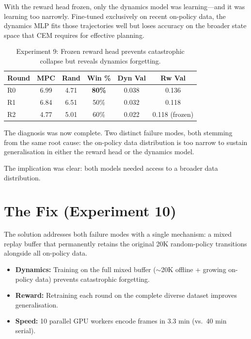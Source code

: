 \documentclass{article}
\begin{document}
\begin{failurebox}
\small With the reward head frozen, only the dynamics model was learning---and it was learning too narrowly. Fine-tuned exclusively on recent on-policy data, the dynamics MLP fits those trajectories well but loses accuracy on the broader state space that CEM requires for effective planning.
\end{failurebox}

\begin{table}[H]
\centering
\caption{Experiment 9: Frozen reward head prevents catastrophic collapse but reveals dynamics forgetting.}
\label{tab:exp9}
\begin{tabular}{lccccc}
\toprule
\textbf{Round} & \textbf{MPC} & \textbf{Rand} & \textbf{Win \%} & \textbf{Dyn Val} & \textbf{Rw Val} \\
\midrule
R0 & 6.99 & 4.71 & \textbf{80\%} & 0.038 & 0.136 \\
R1 & 6.84 & 6.51 & 50\% & 0.032 & 0.118 \\
R2 & 4.77 & 5.01 & 60\% & 0.022 & 0.118 (frozen) \\
\bottomrule
\end{tabular}
\end{table}

The diagnosis was now complete. Two distinct failure modes, both stemming from the same root cause: the on-policy data distribution is too narrow to sustain generalisation in either the reward head or the dynamics model.

The implication was clear: both models needed access to a broader data distribution.

\section{The Fix (Experiment 10)}

The solution addresses both failure modes with a single mechanism: a mixed replay buffer that permanently retains the original 20K random-policy transitions alongside all on-policy data.

\begin{breakthroughbox}
\begin{itemize}
    \item \textbf{Dynamics:} Training on the full mixed buffer ($\sim$20K offline + growing on-policy data) prevents catastrophic forgetting.
    \item \textbf{Reward:} Retraining each round on the complete diverse dataset improves generalisation.
    \item \textbf{Speed:} 10 parallel GPU workers encode frames in 3.3 min (vs.\ 40 min serial).
\end{itemize}
\end{breakthroughbox}
\end{document}

